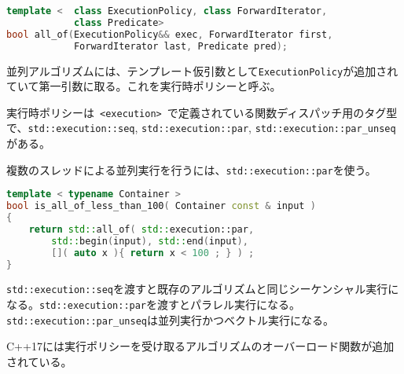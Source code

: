 \begin{lstlisting}[language=C++]
template <  class ExecutionPolicy, class ForwardIterator,
            class Predicate>
bool all_of(ExecutionPolicy&& exec, ForwardIterator first,
            ForwardIterator last, Predicate pred);
\end{lstlisting}

並列アルゴリズムには、テンプレート仮引数として\lstinline!ExecutionPolicy!が追加されていて第一引数に取る。これを実行時ポリシーと呼ぶ。

実行時ポリシーは~\lstinline!<execution>!~で定義されている関数ディスパッチ用のタグ型で、\lstinline!std::execution::seq!,
\lstinline!std::execution::par!,
\lstinline!std::execution::par_unseq!がある。

複数のスレッドによる並列実行を行うには、\lstinline!std::execution::par!を使う。

\begin{lstlisting}[language=C++]
template < typename Container >
bool is_all_of_less_than_100( Container const & input )
{
    return std::all_of( std::execution::par,
        std::begin(input), std::end(input),
        []( auto x ){ return x < 100 ; } ) ;
}
\end{lstlisting}

\lstinline!std::execution::seq!を渡すと既存のアルゴリズムと同じシーケンシャル実行になる。\lstinline!std::execution::par!を渡すとパラレル実行になる。\lstinline!std::execution::par_unseq!は並列実行かつベクトル実行になる。

C++17には実行ポリシーを受け取るアルゴリズムのオーバーロード関数が追加されている。

%

%

